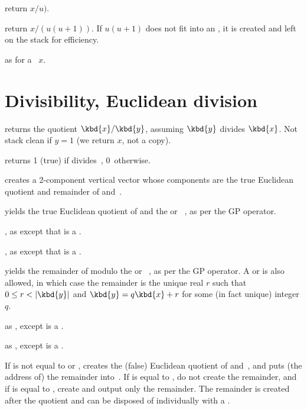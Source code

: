  return $x/u)$.

 return $x/(u(u+1))$. If $u(u+1)$
does not fit into an , it is created and left on the stack for efficiency.

 as  for a
~$x$.

\section{Divisibility, Euclidean division}

 returns the quotient $\kbd{x} / \kbd{y}$,
assuming $\kbd{y}$ divides $\kbd{x}$. Not stack clean if $y = 1$
(we return $x$, not a copy).

  returns 1 (true) if  divides~,
0~otherwise.

 creates a 2-component vertical
vector whose components are the true Euclidean quotient and remainder
of  and~.

 yields the true Euclidean
quotient of  and the  or ~, as per
the \kbd{\bs} GP operator.

, as 
except that  is a .

, as 
except that  is a .

 yields the remainder of 
modulo the  or ~, as per the \kbd{\%} GP operator.
A  or   is also allowed, in which case the
remainder is the unique real $r$ such that $0 \leq r < |\kbd{y}|$ and
$\kbd{y} = q\kbd{x} + r$ for some (in fact unique) integer $q$.

 as , except  is
a .

 as , except  is
a .

 If  is not equal to
 or , creates the (false) Euclidean quotient of
 and~, and puts (the address of) the remainder into~.
If  is equal to , do not create the remainder, and if
 is equal to , create and output only the remainder.
The remainder is created after the quotient and can be disposed of
individually with a .

